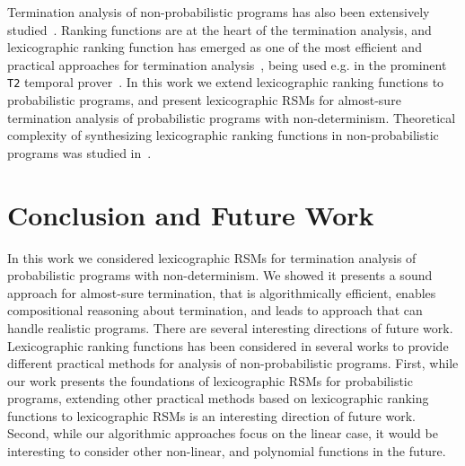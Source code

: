 \smallskip{}
Termination analysis of non-probabilistic programs has also been extensively 
studied~\cite{PR04:transition-invariants, 
CPR06:terminator,DBLP:conf/cav/BradleyMS05,DBLP:conf/tacas/ColonS01, 
DBLP:conf/vmcai/PodelskiR04,DBLP:conf/pods/SohnG91,BMS05b,LJB01,KSTW10:compositional-transition-invariants,
 CPR11:termination-cacm}.
Ranking functions are at the heart of the termination analysis, and lexicographic 
ranking function has emerged as one of the most efficient and practical approaches
for termination analysis~\cite{CSZ13,ADFG10:lexicographic,GMR15:rank-extremal}, 
being used e.g. in 
the prominent \texttt{T2} temporal prover~\cite{BCIKP16:T2}.
In this work we extend lexicographic ranking functions to probabilistic 
programs,
and present lexicographic RSMs for almost-sure termination analysis of probabilistic programs
with non-determinism. Theoretical complexity of synthesizing lexicographic 
ranking functions in non-probabilistic programs was studied 
in~\cite{BG13:integer-ranking,BG15:lexicographic-complexity}.



\section{Conclusion and Future Work}
In this work we considered lexicographic RSMs for termination analysis of probabilistic
programs with non-determinism.
We showed it presents a sound approach for almost-sure termination, that is
algorithmically efficient, enables compositional reasoning about termination, 
and leads to approach that can handle realistic programs.
There are several interesting directions of future work.
Lexicographic ranking functions has been considered in several works to 
provide different practical methods for analysis of non-probabilistic programs.
First, while our work presents the foundations of lexicographic RSMs for probabilistic 
programs, extending other practical methods based on lexicographic ranking 
functions to 
lexicographic RSMs is an interesting direction of future work.
Second, while our algorithmic approaches focus on the linear case, it would be interesting
to consider other non-linear, and polynomial functions in the future.





